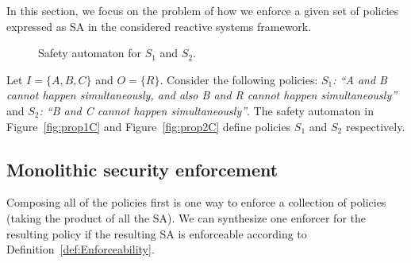 In this section, we focus on the problem of how we enforce a given set of policies expressed as SA in the considered reactive systems framework.
\begin{figure}
	\centering
	\centering
	\hspace{0.1em}
	\caption{Safety automaton for $S_1$ and $S_2$.}
	\label{fig:prop1&2}
\end{figure}
\begin{example}
	\label{eg:propC}
	Let $I= \{A,B,C\}$ and $O = \{R\}$.
	Consider the following policies: \textit{$S_1$: ``A and B cannot happen simultaneously, and also B and R cannot happen simultaneously''} and \textit{$S_2$: ``B and C cannot happen simultaneously''}.
	The safety automaton in Figure~\ref{fig:prop1C} and Figure~\ref{fig:prop2C} define policies $S_1$ and $S_2$ respectively.
\end{example}
%
\subsection{Monolithic security enforcement}
Composing all of the policies first is one way to enforce a collection of policies (taking the product of all the SA).
We can synthesize one enforcer for the resulting policy if the resulting SA is enforceable according to Definition~\ref{def:Enforceability}.



